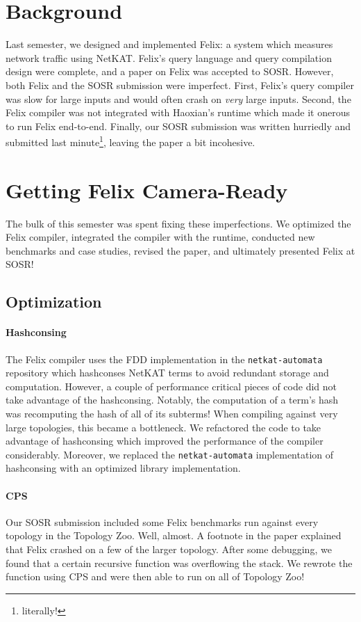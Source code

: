 \newcommand{\netauto}{\texttt{netkat-automata}}

\section{Background}
Last semester, we designed and implemented Felix: a system which measures
network traffic using NetKAT. Felix's query language and query compilation
design were complete, and a paper on Felix was accepted to SOSR. However,
both Felix and the SOSR submission were imperfect. First, Felix's query
compiler was slow for large inputs and would often crash on \emph{very} large
inputs. Second, the Felix compiler was not integrated with Haoxian's runtime
which made it onerous to run Felix end-to-end. Finally, our SOSR submission was
written hurriedly and submitted last minute\footnote{literally!}, leaving the
paper a bit incohesive.

\section{Getting Felix Camera-Ready}
The bulk of this semester was spent fixing these imperfections. We optimized
the Felix compiler, integrated the compiler with the runtime, conducted new
benchmarks and case studies, revised the paper, and ultimately presented Felix
at SOSR!

\subsection{Optimization}
\paragraph{Hashconsing}
The Felix compiler uses the FDD implementation in the \netauto{} repository
which hashconses NetKAT terms to avoid redundant storage and computation.
However, a couple of performance critical pieces of code did not take advantage
of the hashconsing. Notably, the computation of a term's hash was recomputing
the hash of all of its subterms! When compiling against very large topologies,
this became a bottleneck. We refactored the code to take advantage of
hashconsing which improved the performance of the compiler considerably.
Moreover, we replaced the \netauto{} implementation of hashconsing with an
optimized library implementation.

\paragraph{CPS}
Our SOSR submission included some Felix benchmarks run against every topology
in the Topology Zoo. Well, almost. A footnote in the paper explained that Felix
crashed on a few of the larger topology. After some debugging, we found that a
certain recursive function was overflowing the stack. We rewrote the function
using CPS and were then able to run on all of Topology Zoo!

